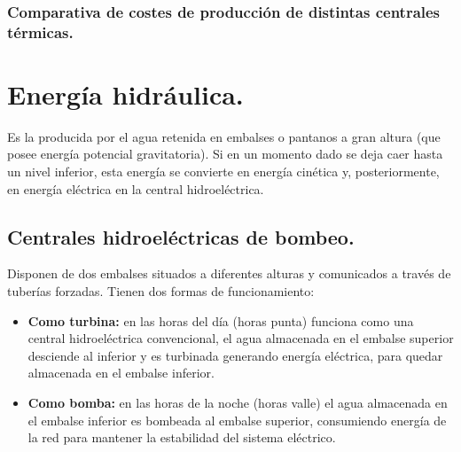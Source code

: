 		\subsubsection{Comparativa de costes de producción de distintas centrales térmicas.}
			\begin{center}
			\end{center}

\section{Energía hidráulica.}
		Es la producida por el agua retenida en embalses o pantanos a gran altura (que posee
		energía potencial gravitatoria). Si en un momento dado se deja caer hasta un nivel inferior, esta energía se
		convierte en energía cinética y, posteriormente, en energía eléctrica en la central hidroeléctrica.
		
	\subsection{Centrales hidroeléctricas de bombeo.}
		Disponen de dos embalses situados a diferentes alturas y comunicados a través de tuberías forzadas. Tienen dos formas de funcionamiento:
		\begin{itemize}
			\item \textbf{Como turbina:} en las horas del día (horas punta) funciona como una central hidroeléctrica
			convencional, el agua almacenada en el embalse superior desciende al inferior y es turbinada
			generando energía eléctrica, para quedar almacenada en el embalse inferior.
			
			\item \textbf{Como bomba:} en las horas de la noche (horas valle) el agua almacenada en el embalse inferior
			es bombeada al embalse superior, consumiendo energía de la red para mantener la estabilidad del
			sistema eléctrico.
		\end{itemize}
		
